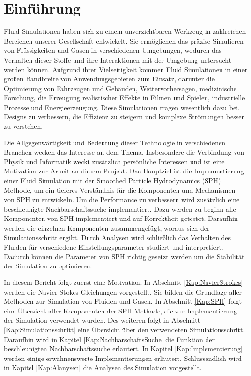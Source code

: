 \documentclass[a4paper, 12pt]{article}
\begin{document}
\onehalfspacing
\makeTitleAndTable

\section{Einführung}
Fluid Simulationen haben sich zu einem unverzichtbaren Werkzeug in zahlreichen Bereichen unserer Gesellschaft entwickelt. Sie ermöglichen das präzise Simulieren von Flüssigkeiten und Gasen in verschiedenen Umgebungen, wodurch das Verhalten dieser Stoffe und ihre Interaktionen mit der Umgebung untersucht werden können. Aufgrund ihrer Vielseitigkeit kommen Fluid Simulationen in einer großen Bandbreite von Anwendungsgebieten zum Einsatz, darunter die Optimierung von Fahrzeugen und Gebäuden, Wettervorhersagen, medizinische Forschung, die Erzeugung realistischer Effekte in Filmen und Spielen, industrielle Prozesse und Energieerzeugung. Diese Simulationen tragen wesentlich dazu bei, Designs zu verbessern, die Effizienz zu steigern und komplexe Strömungen besser zu verstehen.

Die Allgegenwärtigkeit und Bedeutung dieser Technologie in verschiedenen Branchen wecken das Interesse an dem Thema. Insbesondere die Verbindung von Physik und Informatik weckt zusätzlich persönliche Interessen und ist eine Motivation zur Arbeit an diesem Projekt. Das Hauptziel ist die Implementierung einer Fluid Simulation mit der Smoothed Particle Hydrodynamics (SPH) Methode, um ein tieferes Verständnis für die Komponenten und Mechanismen von SPH zu entwickeln. Um die Performance zu verbessern wird zusätzlich eine beschleunigte Nachbarschaftssuche implementiert. 
Dazu werden zu beginn alle Komponenten von SPH implementiert und auf Korrektheit getestet. Daraufhin werden die einzelnen Komponenten zusammengefügt, woraus sich der Simulationsschritt ergibt. Durch Analysen wird schließlich das Verhalten des Fluiden für verschiedene Einstellungsparameter studiert und interpretiert. Dadurch können die Parameter von SPH richtig gesetzt werden um die Stabilität der Simulation zu optimieren.

In diesem Bericht folgt zuerst eine Motivation. In Abschnitt \ref{Kap:NavierStrokes} werden die Navier-Stokes-Gleichungen vorgestellt. Sie bilden die Grundlage aller Methoden zur Simulation von Fluiden und Gasen. In Abschnitt \ref{Kap:SPH} folgt eine Übersicht aller Komponenten der SPH-Methode, die zur Implementierung der Simulation verwendet wurden. Des weiteren folgt in Abschnitt \ref{Kap:Simulationsschritt} eine Übersicht über den verwendeten Simulationsschritt. Daraufhin wird in Kapitel \ref{Kap:NachbarschaftsSuche} die Funktion der beschleunigten Nachbarschaftssuche erläutert. In Kapitel \ref{Kap:Implementierung} werden einige erwähnenswerte Implementierungen erläutert. Schlussendlich wird in Kapitel \ref{Kap:Alanysen} die Analysen des Simulation vorgestellt.
\end{document}
